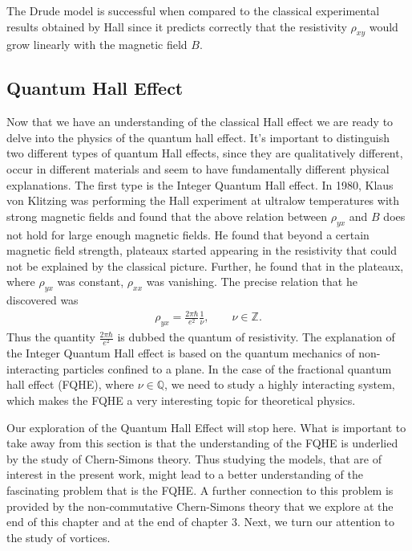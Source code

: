         The Drude model is successful when compared to the classical experimental results obtained by Hall since it predicts correctly that the resistivity  $\rho_{xy}$ would grow linearly with the magnetic field $B$.
        \subsection{Quantum Hall Effect}
        Now that we have an understanding of the classical Hall effect we are ready to delve into the physics of the quantum hall effect. It's important to distinguish two different types of quantum Hall effects, since they are qualitatively different, occur in different materials and seem to have fundamentally different physical explanations.
        The first type is the Integer Quantum Hall effect. In 1980, Klaus von Klitzing was performing the Hall experiment at ultralow temperatures with strong magnetic fields and found that the above relation between $\rho_{yx}$ and $B$ does not hold for large enough magnetic fields. He found that beyond a certain magnetic field strength, plateaux started appearing in the resistivity that could not be explained by the classical picture. Further, he found that in the plateaux, where $\rho_{yx}$ was constant, $\rho_{xx}$ was vanishing. The precise relation that he discovered was
        \begin{align}
            \rho_{yx} = \frac{2 \pi \hbar}{e^2} \frac{1}{\nu}, \qquad \nu \in \mathbb{Z}.
        \end{align}
        Thus the quantity $\frac{2 \pi \hbar}{e^2}$ is dubbed the quantum of resistivity. The explanation of the Integer Quantum Hall effect is based on the quantum mechanics of non-interacting particles confined to a plane. In the case of the fractional quantum hall effect (FQHE), where $\nu \in \mathbb{Q}$, we need to study a highly interacting system, which makes the FQHE a very interesting topic for theoretical physics.

        Our exploration of the Quantum Hall Effect will stop here. What is important to take away from this section is that the understanding of the FQHE is underlied by the study of Chern-Simons theory. Thus studying the models, that are of interest in the present work, might lead to a better understanding of the fascinating problem that is the FQHE. A further connection to this problem is provided by the non-commutative Chern-Simons theory that we explore at the end of this chapter and at the end of chapter 3. Next, we turn our attention to the study of vortices.

